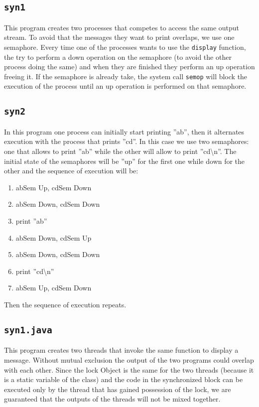 \subsection{\texttt{syn1}}
This program creates two processes that competes to access the same output stream. To avoid that the messages they want to print overlaps, we use one semaphore. Every time one of the processes wants to use the \texttt{display} function, the try to perform a down operation on the semaphore (to avoid the other process doing the same) and when they are finished they perform an up operation freeing it. If the semaphore is already take, the system call \texttt{semop} will block the execution of the process until an up operation is performed on that semaphore.
\subsection{\texttt{syn2}}
In this program one process can initially start printing ''ab'', then it alternates execution with the process that prints ''cd''. In this case we use two semaphores: one that allows to print ''ab'' while the other will allow to print ''cd\textbackslash{}n''. The initial state of the semaphores will be ''up'' for the first one while down for the other and the sequence of execution will be:
\begin{enumerate}
\item abSem Up, cdSem Down
\item abSem Down, cdSem Down
\item print ''ab''
\item abSem Down, cdSem Up
\item abSem Down, cdSem Down
\item print ''cd\textbackslash{}n''
\item abSem Up, cdSem Down
\end{enumerate}
Then the sequence of execution repeats.
\subsection{\texttt{syn1.java}}
This program creates two threads that invoke the same function to display a message. Without mutual exclusion the output of the two programs could overlap with each other. Since the lock Object is the same for the two threads (because it is a static variable of the class) and the code in the synchronized block can be executed only by the thread that has gained possession of the lock, we are guaranteed that the outputs of the threads will not be mixed together.
